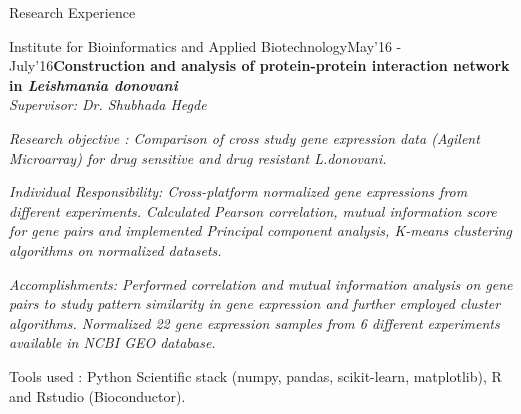 \documentclass{resume} %
\begin{document}
\begin{rSection}{Research Experience}

\begin{rSubsection}{Institute for Bioinformatics and Applied Biotechnology}{May'16 - July'16}{\textbf{Construction and analysis of protein-protein interaction network in \textit{Leishmania donovani}
} \\
 \emph{\it Supervisor: Dr. Shubhada Hegde} \\[-0.6cm]}{}
	\item \it {Research objective} : Comparison of cross study gene expression data (Agilent Microarray) for drug sensitive and drug resistant \textit{L.donovani}.
    \item \it {Individual Responsibility}: Cross-platform normalized gene expressions from different experiments. Calculated Pearson correlation, mutual information score for gene pairs and implemented Principal component analysis, K-means clustering algorithms on normalized datasets.	
	\item \it {Accomplishments:} Performed correlation and mutual information analysis on gene pairs to study pattern similarity in gene expression and further employed cluster algorithms. Normalized 22 gene expression samples from 6 different experiments available in NCBI GEO database.
	\item Tools used : Python Scientific stack (numpy, pandas, scikit-learn, matplotlib), R and Rstudio (Bioconductor).
\end{rSubsection}


\end{rSection}
\end{document}
